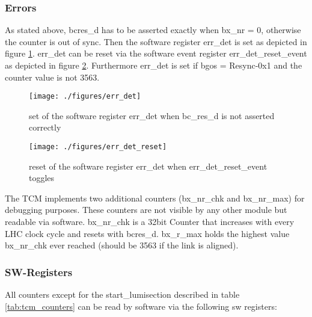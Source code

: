 \subsubsection{Errors}\label{subsec:frame:tcmerrors}
As stated above, bcres\_d has to be asserted exactly when bx\_nr = 0, otherwise the counter is out of sync. Then the software register err\_det is set as depicted in figure \ref{fig:err_det}. err\_det can be reset via the software event register err\_det\_reset\_event as depicted in figure \ref{fig:err_det_reset}. Furthermore err\_det is set if bgos = Resync-0x1 and the counter value is not 3563.

\begin{figure}[ht]
  \texttt{[image: ./figures/err\_det]}
  \caption{set of the software register err\_det when bc\_res\_d is not asserted correctly}
  \label{fig:err_det}
\end{figure}

\begin{figure}[ht]
  \texttt{[image: ./figures/err\_det\_reset]}
  \caption{reset of the software register err\_det when err\_det\_reset\_event toggles}
  \label{fig:err_det_reset}
\end{figure}

The TCM implements two additional counters (bx\_nr\_chk and bx\_nr\_max) for debugging purposes. These counters are not visible by any other module but readable via software. bx\_nr\_chk is a 32bit Counter that increases with every LHC clock cycle and resets with bcres\_d. bx\_r\_max holds the highest value bx\_nr\_chk ever reached (should be 3563 if the link is aligned).

\subsubsection{SW-Registers}
All counters except for the start\_lumisection described in table \ref{tab:tcm_counters} can be read by software via the following sw registers:

